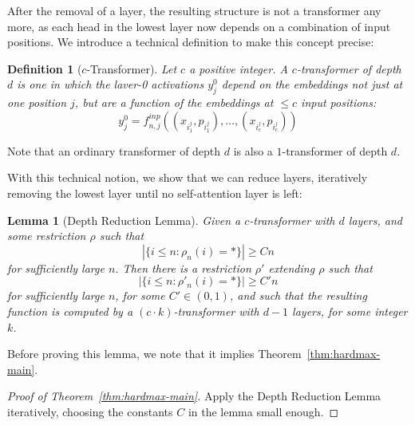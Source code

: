 \documentclass[11pt,a4paper]{article}
\newcounter{theorem}
\newtheorem{defin}[theorem]{Definition}
\newtheorem{lemma}[theorem]{Lemma}
\begin{document}
After the removal of a layer, the resulting structure is not a transformer any more, as each head in the lowest layer now depends on a combination of input positions.
We introduce a technical definition to make this concept precise:

\begin{defin}[$c$-Transformer]
Let $c$ a positive integer. A $c$-transformer of depth $d$ is one in which the laver-0 activations $y_j^0$ depend on the embeddings not just at one position $j$, but are a function of the embeddings at $\leq c$ input positions:
\begin{equation}
    y_j^0 = f^{inp}_{n,j}((x_{i_1^j}, p_{i_1^j}), \dots, (x_{i_c^j}, p_{i_c^j} ))
\end{equation}
\end{defin}

Note that an ordinary transformer  of depth $d$ is also a $1$-transformer of depth $d$.


With this technical notion, we show that we can reduce layers, iteratively removing the lowest layer until no self-attention layer is left:
\begin{lemma}[Depth Reduction Lemma]
Given a $c$-transformer with $d$ layers, and some restriction $\rho$ such that
\begin{equation}
|\{i \leq n: \rho_n(i) = *\}| \geq Cn
\end{equation}
for sufficiently large $n$.
Then there is a restriction $\rho'$ extending $\rho$ 
such that
\begin{equation}
|\{i \leq n: \rho'_n(i) = *\}| \geq C'n
\end{equation}
for sufficiently large $n$, 
for some $C' \in (0,1)$, 
and such that the resulting function is computed by a $(c\cdot k)$-transformer with $d-1$ layers, for some integer $k$.
\end{lemma}
Before proving this lemma, we note that it implies Theorem~\ref{thm:hardmax-main}.
\begin{proof}[Proof of Theorem~\ref{thm:hardmax-main}]
Apply the Depth Reduction Lemma iteratively, choosing the constants $C$ in the lemma small enough.
\end{proof}


\end{document}
